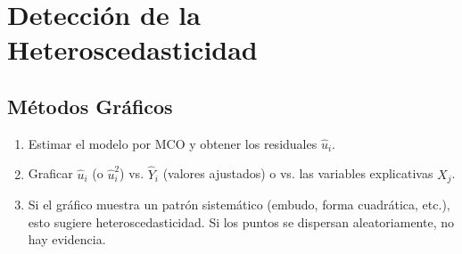 \documentclass[12pt,a4paper]{report}
\theoremstyle{definition}
\theoremstyle{remark}
\newcommand{\uhat}{\hat{u}}
\newcommand{\yhat}{\hat{Y}}
\begin{document}
\section{Detección de la Heteroscedasticidad}

\subsection{Métodos Gráficos}

\begin{tcolorbox}[notastyle, title={Procedimiento Gráfico}]
  \begin{enumerate}[label=\textbf{Paso \arabic*:}]
    \item Estimar el modelo por MCO y obtener los residuales $\uhat_i$.
    \item Graficar $\uhat_i$ (o $\uhat_i^2$) vs. $\yhat_i$ (valores ajustados) o vs. las variables explicativas $X_j$.
    \item Si el gráfico muestra un patrón sistemático (embudo, forma cuadrática, etc.), esto sugiere heteroscedasticidad. Si los puntos se dispersan aleatoriamente, no hay evidencia.
  \end{enumerate}
\end{tcolorbox}
\end{document}
